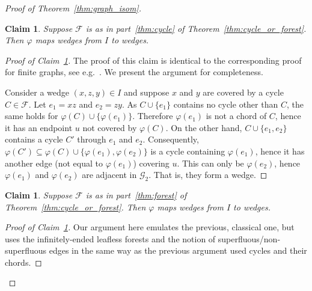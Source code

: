 \documentclass{article}
\theoremstyle{plain}
\newtheorem{cl}[thm]{Claim}
\theoremstyle{definition}
\newcommand{\cG}{\mathcal{G}}
\newcommand{\cF}{\mathcal{F}}
\newcommand{\fg}{\varphi}
\begin{document}
\begin{proof}[Proof of Theorem~\ref{thm:graph_isom}]
    \begin{cl}\label{lem:w_to_w_cycle}
    Suppose $\cF$ is as in part~\ref{thm:cycle} of Theorem~\ref{thm:cycle_or_forest}. Then $\fg$ maps wedges from $I$ to wedges.
    \end{cl}
    \begin{proof}[Proof of Claim~\ref{lem:w_to_w_cycle}]
         The proof of this claim is identical to the corresponding proof for finite graphs, see e.g.\ \cite[Problem 15.9]{lovasz2007combinatorial}. We present the argument for completeness.

         Consider a wedge $(x,z,y)\in I$ and suppose $x$ and $y$ are covered by a cycle $C\in\cF$. Let $e_1 =xz$ and $e_2=zy$. As $C \cup \{e_1\}$ contains no cycle other than $C$, the same holds for $\varphi(C)\cup\{\varphi(e_1)\}$. Therefore $\varphi(e_1)$ is not a chord of $C$, hence it has an endpoint $u$ not covered by $\varphi(C)$. On the other hand, $C \cup\{e_1,e_2\}$ contains a cycle $C'$ through $e_1$ and $e_2$. Consequently, $\varphi(C') \subseteq \varphi(C)\cup\{\varphi(e_1),\varphi(e_2)\}$ is a cycle containing $\varphi(e_1)$, hence it has another edge (not equal to $\varphi(e_1)$) covering $u$. This can only be $\varphi(e_2)$, hence $\varphi(e_1)$ and $\varphi(e_2)$ are adjacent in $\cG_2$. That is, they form a wedge.
    \end{proof}


    \begin{cl}\label{lem:w_to_w_forest}
    Suppose $\cF$ is as in part~\ref{thm:forest} of Theorem~\ref{thm:cycle_or_forest}. Then $\fg$ maps wedges from $I$ to wedges.
    \end{cl}
    \begin{proof}[Proof of Claim~\ref{lem:w_to_w_forest}]
        Our argument here emulates the previous, classical one, but uses the infinitely-ended leafless forests and the notion of superfluous/non-superfluous edges in the same way as the previous argument used cycles and their chords.
        

\end{proof}
\end{proof}
\end{document}
